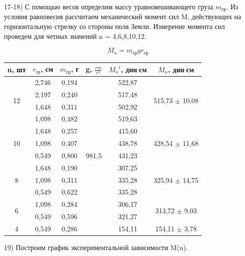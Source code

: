 \documentclass[a4paper,12pt]{article}
\begin{document}
17-18) С помощью весов определим массу уравновешивающего груза $m_{гр}$. Из условия равновесия рассчитаем механический момент сил M, действующих на горизонтальную стрелку со стороны поля Земли. Измерение момента сил проведем для четных значений n = 4,6,8,10,12.

$$ M_n = m_{гр}gr_{гр}  $$	

\begin{center}
\begin{tabular}{|c|c|c|c|c|c|}
	\hline
	n, шт & $r_{гр}$, см & $m_{гр}$, г & g, $\frac{cm}{c^2}$ & ${M_n}^i$, дин$\cdot$см & $M_n$, дин$\cdot$см\\
	\hline
	\multirow{4}{*}{12} & 2,746 & 0,194 & \multirow{13}{*}{981,5} & 522,87 & \multirow{4}{*}{515,73 $\pm$ 10,08}\\
	\cline{2-3}\cline{5-5} 		& 2,197 & 0,240 &  & 517,48 & \\
	\cline{2-3}\cline{5-5} 		& 1,648 & 0,311 &  & 502,92 & \\
	\cline{2-3}\cline{5-5} 		& 1,098 & 0,482 &  & 519,63 & \\
	\cline{1-3}\cline{5-6}
	\multirow{3}{*}{10} & 1,648 & 0,257 &  & 415,60 & \multirow{3}{*}{428,54 $\pm$ 11,68}\\
	\cline{2-3}\cline{5-5}      & 1,098 & 0,407 &  & 438,78 & \\
    \cline{2-3}\cline{5-5}      & 0,549 & 0,800 &  & 431,23 & \\
    \cline{1-3}\cline{5-6}
    \multirow{3}{*}{8} & 1,648 & 0,190 &  & 307,25 & \multirow{3}{*}{325,94 $\pm$ 14,75}\\
    \cline{2-3}\cline{5-5}      & 1,098 & 0,311 &  & 335,28 & \\
    \cline{2-3}\cline{5-5}      & 0,549 & 0,622 &  & 335,28 & \\
   	\cline{1-3}\cline{5-6}
   	\multirow{2}{*}{6} & 1,098 & 0,284 &  & 306,17 & \multirow{2}{*}{313,72 $\pm$ 9,03}\\
    \cline{2-3}\cline{5-5}      & 0,549 & 0,596 &  & 321,27 & \\
	\cline{1-3}\cline{5-6}
	4 & 0,549 & 0,286 & & 154,11 & 154,11 $\pm$ 3,78 \\
	\hline
\end{tabular}
\end{center}

19) Построим график экспериментальной зависимости M(n).

\end{document}
